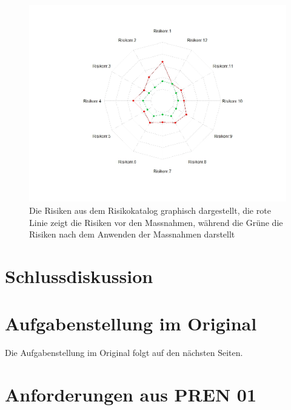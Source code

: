 \documentclass[a4paper]{report}
\begin{document}
\begin{figure}[h!]
	\centering
	\includegraphics[width=\textwidth,keepaspectratio]{Risikomatrix_Spinne}
	\caption{Die Risiken aus dem Risikokatalog graphisch dargestellt, die rote Linie zeigt die Risiken vor den Massnahmen, während die Grüne die Risiken nach dem Anwenden der Massnahmen darstellt}
	\label{fig:Risikomatrix_Spinne}
\end{figure}

\chapter{Schlussdiskussion}
\label{ch:SchlussDisku}

\listoffigures

\listoftables

\printbibliography

\appendix

\chapter{Aufgabenstellung im Original}
\label{app:ch:AufgabenOriginal}
Die Aufgabenstellung im Original folgt auf den nächsten Seiten.



\chapter{Anforderungen aus PREN 01}
\label{app:ch:Anforderungen}
\end{document}
